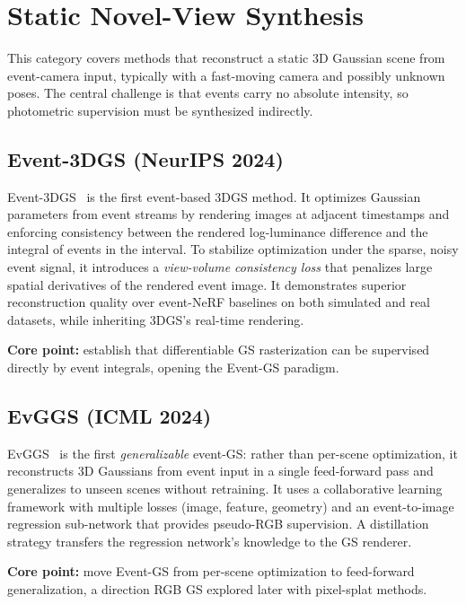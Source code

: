 \section{Static Novel-View Synthesis}
\label{sec:static}

This category covers methods that reconstruct a static 3D Gaussian scene from event-camera input, typically with a fast-moving camera and possibly unknown poses. The central challenge is that events carry no absolute intensity, so photometric supervision must be synthesized indirectly.

\subsection{Event-3DGS (NeurIPS 2024)}
\label{sec:static:event3dgs}

Event-3DGS~\cite{han2024event3dgs} is the first event-based 3DGS method. It optimizes Gaussian parameters from event streams by rendering images at adjacent timestamps and enforcing consistency between the rendered log-luminance difference and the integral of events in the interval. To stabilize optimization under the sparse, noisy event signal, it introduces a \emph{view-volume consistency loss} that penalizes large spatial derivatives of the rendered event image. It demonstrates superior reconstruction quality over event-NeRF baselines on both simulated and real datasets, while inheriting 3DGS's real-time rendering.

\textbf{Core point:} establish that differentiable GS rasterization can be supervised directly by event integrals, opening the Event-GS paradigm.

\subsection{EvGGS (ICML 2024)}
\label{sec:static:evggs}

EvGGS~\cite{wang2024evggs} is the first \emph{generalizable} event-GS: rather than per-scene optimization, it reconstructs 3D Gaussians from event input in a single feed-forward pass and generalizes to unseen scenes without retraining. It uses a collaborative learning framework with multiple losses (image, feature, geometry) and an event-to-image regression sub-network that provides pseudo-RGB supervision. A distillation strategy transfers the regression network's knowledge to the GS renderer.

\textbf{Core point:} move Event-GS from per-scene optimization to feed-forward generalization, a direction RGB GS explored later with pixel-splat methods.

